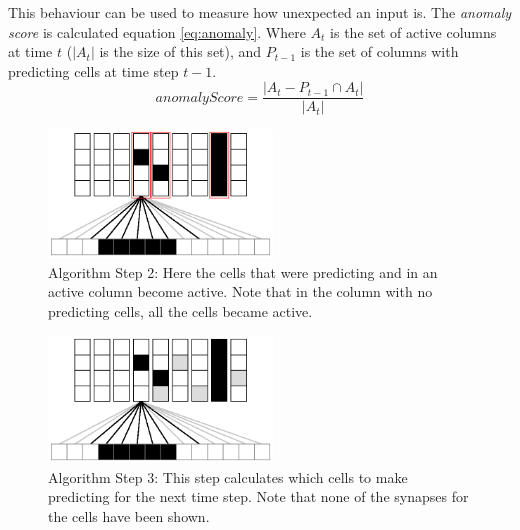 \documentclass[a4paper]{jpconf}
\begin{document}
		This behaviour can be used to measure how unexpected an input is. The \emph{anomaly score} is calculated equation \ref{eq:anomaly}. Where $A_t$ is the set of active columns at time $t$ ($|A_t|$ is the size of this set), and $P_{t-1}$ is the set of columns with predicting cells at time step $t-1$.
		\begin{equation}\label{eq:anomaly}
		anomalyScore = \frac{| A_t-P_{t-1} \cap A_t |}{|A_t|}
		\end{equation}


\begin{figure}[h]
	\centering
	\includegraphics[width=0.53\textwidth]{algorithmDiagramStep2.eps}\hspace{1pc}%
	\begin{minipage}[b]{0.3\textwidth}
	\caption{Algorithm Step 2: Here the cells that were predicting and in an active column become active. Note that in the column with no predicting cells, all the cells became active.}\label{fig:algorithmDiagramStep2}
	\end{minipage}
\end{figure}

\begin{figure}[h]
	\centering
	\includegraphics[width=0.53\textwidth]{algorithmDiagramStep3.eps}\hspace{1pc}%
	\begin{minipage}[b]{0.3\textwidth}
	\caption{Algorithm Step 3: This step calculates which cells to make predicting for the next time step. Note that none of the synapses for the cells have been shown.}\label{fig:algorithmDiagramStep3}
	\end{minipage}
\end{figure}
\end{document}
